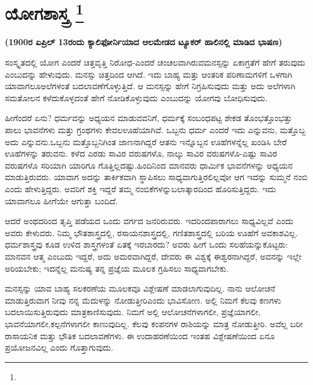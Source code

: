 
\vspace{-0.8cm}

\chapter[ಯೋಗಶಾಸ್ತ್ರ ]{ಯೋಗಶಾಸ್ತ್ರ \protect\footnote{}}

\begin{center}
\textbf{(1900ರ ಏಪ್ರಿಲ್​ 13ರಂದು ಕ್ಯಾಲಿಫೋರ್ನಿಯಾದ ಆಲಮೇಡದ ಟ್ಯೂಕರ್​ ಹಾಲಿನಲ್ಲಿ ಮಾಡಿದ ಭಾಷಣ)}
\end{center}

ಸಂಸ್ಕೃತದಲ್ಲಿ ಯೋಗ ಎಂದರೆ ಚಿತ್ತವೃತ್ತಿ ನಿರೋಧ-ಎಂದರೆ ಚಂಚಲವಾಗಿರುವ\break ಮನಸ್ಸನ್ನು ಏಕಾಗ್ರತೆಗೆ ಹೇಗೆ ತರುವುದು ಎಂಬುದನ್ನು ಹೇಳುವುದು. ಮನಸ್ಸು ಚಿತ್ತದಿಂದ ಆಗಿದೆ. ಇದು ಬಾಹ್ಯ ಮತ್ತು ಆಂತರಿಕ ಪರಿಣಾಮಗಳಿಗೆ ಒಳಗಾಗಿ ಯಾವಾಗಲೂ\break ಅಲೆಗಳಂತೆ ಬದಲಾವಣೆಗೊಳ್ಳುತ್ತಿದೆ. ಆ ಮನಸ್ಸನ್ನು ಹೇಗೆ ನಿಗ್ರಹಿಸುವುದು ಮತ್ತು ಅದು ಅಲೆಗಳಾಗಿ ಸಮತೋಲನ ಕಳೆದುಕೊಳ್ಳದಂತೆ ಹೇಗೆ ನೋಡಿಕೊಳ್ಳುವುದು ಎಂಬುದನ್ನು ಯೋಗವು ಬೋಧಿಸುವುದು.

ಹೀಗೆಂದರೆ ಏನು? ಧರ್ಮವನ್ನು ಅಧ್ಯಯನ ಮಾಡುವವನಿಗೆ, ಧರ್ಮಕ್ಕೆ ಸಂಬಂಧಪಟ್ಟ ಶೇಕಡ ತೊಂಭತ್ತೊಂಭತ್ತು ಪಾಲು ಭಾವನೆಗಳು ಮತ್ತು ಗ್ರಂಥಗಳು ಕೇವಲ\break ಊಹೆಯಾಗಿವೆ. ಒಬ್ಬನು ಧರ್ಮ ಎಂದರೆ ಇದು ಎನ್ನುವನು, ಮತ್ತೊಬ್ಬ ಅದು ಎನ್ನುವನು.\break ಒಬ್ಬನು ಮತ್ತೊಬ್ಬನಿಗಿಂತ ಜಾಣನಾಗಿದ್ದರೆ ಆತನು ಇನ್ನೊಬ್ಬನ ಊಹೆಗಳನ್ನೆಲ್ಲ ಖಂಡಿಸಿ ಬೇರೆ ಊಹೆಗಳನ್ನು ತರುವನು. ಕಳೆದ ಎರಡು ಸಾವಿರ ವರುಷಗಳೊ, ನಾಲ್ಕು ಸಾವಿರ ವರುಷಗಳೊ-ಎಷ್ಟು ಸಾವಿರ ವರುಷಗಳೊ ಸರಿಯಾಗಿ ಯಾರಿಗೂ ಗೊತ್ತಿಲ್ಲದಷ್ಟು.\break ಹಿಂದಿನಿಂದ ಮಾನವರು ಧಾರ್ಮಿಕ ಭಾವನೆಗಳನ್ನು ಅಧ್ಯಯನ ಮಾಡುತ್ತಿರುವರು. ಯಾವಾಗ ಅದನ್ನು ತಾರ್ಕಿಕವಾಗಿ ಸ್ಥಾಪಿಸಲು ಸಾಧ್ಯವಾಗುತ್ತಿರಲಿಲ್ಲವೋ ಆಗ ಇದನ್ನು ಸುಮ್ಮನೆ ನಂಬಿ ಎಂದು ಹೇಳುತ್ತಿದ್ದರು. ಅವರಿಗೆ ಶಕ್ತಿ ಇದ್ದರೆ ತಮ್ಮ ನಂಬಿಕೆಗಳನ್ನು\break ಬಲಾತ್ಕಾರದಿಂದ ಹೊರಿಸುತ್ತಿದ್ದರು. ಇದು ಯಾವಾಗಲೂ ಹೀಗೆಯೇ ಆಗುತ್ತಾ ಬಂದಿದೆ.

\vskip 5pt

ಆದರೆ ಅಂಥದರಿಂದ ತೃಪ್ತಿ ಪಡೆಯದ ಒಂದು ವರ್ಗದ ಜನರಿರುವರು. ಇದರಿಂದ\break ಪಾರಾಗಲು ಸಾಧ್ಯವಿಲ್ಲವೆ ಎಂದು ಅವರು ಕೇಳುವರು. ನಿಮ್ಮ ಭೌತಶಾಸ್ತ್ರದಲ್ಲಿ, ರಸಾಯನ\break ಶಾಸ್ತ್ರದಲ್ಲಿ, ಗಣಿತಶಾಸ್ತ್ರದಲ್ಲಿ ಬರಿಯ ಊಹೆಗೆ ಅವಕಾಶವಿಲ್ಲ. ಧರ್ಮಶಾಸ್ತ್ರವು ಕೂಡ ಉಳಿದ ಶಾಸ್ತ್ರಗಳಂತೆ ಏತಕ್ಕೆ ಇರಬಾರದು? ಅವರು ಹೀಗೆ ಒಂದು ಸಲಹೆಯನ್ನು\break ಕೊಟ್ಟರು: ಮಾನವನ ಆತ್ಮ ಎಂಬುದು ಇದ್ದರೆ, ಅದು ಅಮರವಾಗಿದ್ದರೆ, ದೇವರು ಈ ವಿಶ್ವಕ್ಕೆ ಈಶ್ವರನಾಗಿದ್ದರೆ, ಅವನನ್ನು ಇಲ್ಲೇ ಅರಿಯಬೇಕು; ಇದನ್ನೆಲ್ಲ ಮನುಷ್ಯ ತನ್ನ ಪ್ರಜ್ಞೆಯ ಮೂಲಕ ಗ್ರಹಿಸಲು ಸಾಧ್ಯವಾಗಬೇಕು.

\vskip 3pt

ಮನಸ್ಸನ್ನು ಯಾವ ಬಾಹ್ಯ ಸಲಕರಣೆಯ ಮೂಲಕವೂ ವಿಶ್ಲೇಷಣೆ ಮಾಡಲಾಗುವುದಿಲ್ಲ. ನಾನು ಆಲೋಚನೆ ಮಾಡುತ್ತಿರುವಾಗ ನೀವು ನನ್ನ ಮೆದುಳನ್ನು ನೋಡುತ್ತೀರಿ\break ಎಂದು ಭಾವಿಸೋಣ. ಅಲ್ಲಿ ನಿಮಗೆ ಕೆಲವು ಕಣಗಳು ಬದಲಾಯಿಸುತ್ತಿರುವುದು ಮಾತ್ರ\break ಕಾಣಿಸುವುದು. ನಿಮಗೆ ಅಲ್ಲಿ ಆಲೋಚನೆಗಳಾಗಲೀ, ಪ್ರಜ್ಞೆಯಾಗಲೀ, ಭಾವನೆಯಾಗಲೀ,\break ಕಲ್ಪನೆಗಳಾಗಲೀ ಕಾಣುವುದಿಲ್ಲ. ಕೆಲವು ಕಂಪನಗಳ ರಾಶಿಯನ್ನು ಮಾತ್ರ ನೋಡುತ್ತೀರಿ. ಅವೆಲ್ಲ ಬರೀ ರಾಸಾಯನಿಕ ಮತ್ತು ಭೌತಿಕ ಬದಲಾವಣೆಗಳು. ಈ ಉದಾಹರಣೆಯಿಂದ ಇಂತಹ ವಿಶ್ಲೇಷಣೆಯಿಂದ ಏನೂ ಪ್ರಯೋಜನವಿಲ್ಲ ಎಂದು ಗೊತ್ತಾಗುವುದು.

